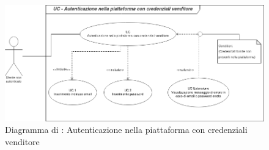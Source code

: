 \begin{figure}[H]
    \centering
    \includegraphics[scale=0.6]{Immagini/DiagrammiUC/AccessoVenditore.png}
    \caption{Diagramma di \actualUC: Autenticazione nella piattaforma con credenziali venditore} 
    \label{fig:LoginVenditore}
\end{figure}

